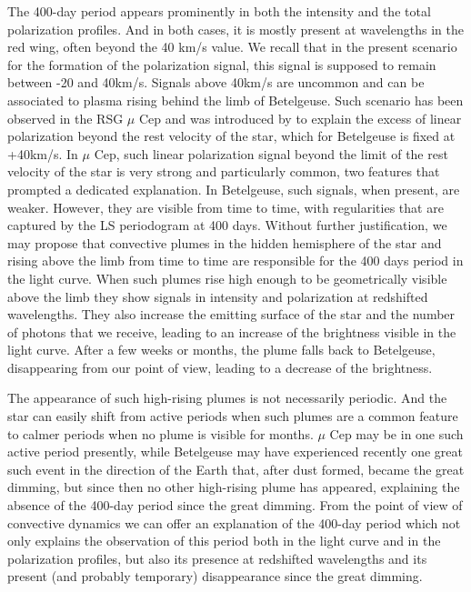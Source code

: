 \documentclass{aa}
\begin{document}
The 400-day period appears prominently in both the intensity and the total polarization profiles. And in both cases, it is mostly present 
at wavelengths in the red wing, often beyond the 40 km/s value.
We recall that in the present scenario for the formation of the polarization signal, this signal is supposed to remain between 
-20 and 40km/s. Signals above 40km/s are uncommon and can be associated to
 plasma rising behind the limb of Betelgeuse. 
Such scenario has been observed in the RSG $\mu$ Cep and was introduced by \cite{lopez_ariste_height_2023} to explain the excess of 
linear polarization beyond  the rest velocity of the star, which for Betelgeuse is fixed at +40km/s. 
In $\mu$ Cep, such  linear polarization signal beyond the limit of the rest velocity of the star is very strong and particularly 
common, two features that prompted a dedicated explanation. In Betelgeuse, such signals, when present, are weaker. However, 
they are visible from time to time, with regularities that are captured by  the LS periodogram at 400 days.
Without further justification, we may propose that convective plumes in the hidden hemisphere of the star and 
rising above the limb from time to time are responsible for the  400 days period in the light curve. When such plumes rise high enough 
to be geometrically visible above the limb they show signals in intensity and polarization at redshifted wavelengths. They also
 increase the emitting surface of the star and  the number of photons that we receive,
leading to an increase of the brightness visible in the light curve. After a few weeks or months, the plume falls back to Betelgeuse, 
disappearing from our point of view,  leading to a decrease of the brightness.

The appearance of such high-rising plumes is not necessarily periodic. And the star can easily shift from active periods when such 
plumes are a common feature to calmer periods when no plume is visible for months. $\mu$ Cep may be in one such active period presently,
while Betelgeuse may have experienced recently one great such event in the direction of the Earth that, after dust formed, became the great 
dimming, but since then no other high-rising plume has appeared, explaining the absence of the 400-day period since the great dimming. 
From the point of view of convective dynamics we can offer an explanation of the 400-day period which not only explains the observation of 
this period both in the light curve and in the polarization profiles, but also its presence at redshifted wavelengths and its present (and probably 
temporary) disappearance since the great dimming.
\end{document}
